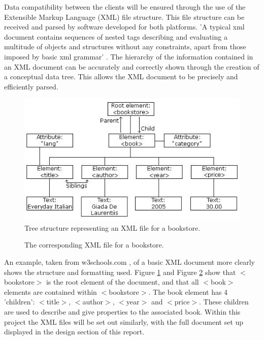 \documentclass[a4paper,12pt]{report}
\begin{document}
Data compatibility between the clients will be ensured through the use of the Extensible Markup Language (XML) file structure. This file structure can be received and parsed by software developed for both platforms. 'A typical xml document contains sequences of nested tags describing and evaluating a multitude of objects and structures without any constraints, apart from those imposed by basic xml grammar' \cite{xmlbook}. The hierarchy of the information contained in an XML document can be accurately and correctly shown through the creation of a conceptual data tree. This allows the XML document to be precisely and efficiently parsed.

\begin{figure}[htb]
\centering
\includegraphics[scale=0.4]{images/nodetree.jpg}
\vspace{-10pt}
\caption{Tree structure representing an XML file for a bookstore.}
\vspace{-10pt}
\label{fig:exampleimg1}
\end{figure}

\begin{figure}[htb]
\centering

\vspace{-10pt}
\caption{The corresponding XML file for a bookstore.}
\label{fig:xml}
\end{figure}

An example, taken from w3schools.com \cite{w3schoolsxmlexample}, of a basic XML document more clearly shows the structure and formatting used. Figure \ref{fig:exampleimg1} and Figure \ref{fig:xml} show that $<$bookstore$>$ is the root element of the document, and that all $<$book$>$ elements are contained within $<$bookstore$>$. The book element has 4 'children': $<$title$>$, $<$author$>$, $<$year$>$ and $<$price$>$. These children are used to describe and give properties to the associated book. Within this project the XML files will be set out similarly, with the full document set up displayed in the design section of this report. 
\end{document}
